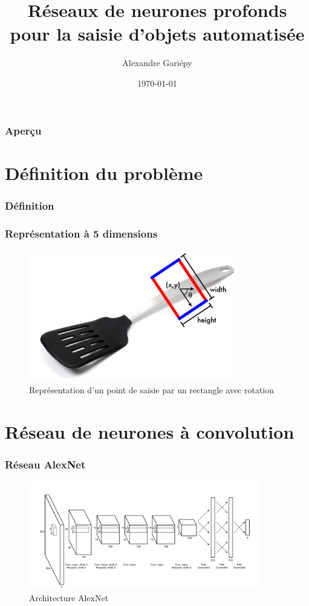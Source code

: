 \documentclass{beamer}
\title[Réseaux de neurones pour saisie automatique]{Réseaux de neurones profonds pour la saisie d'objets automatisée}
\author{Alexandre Gariépy}
\institute[ulaval] 
{
Université Laval \\
\medskip
\textit{alexandre.gariepy.2@ulaval.ca}
}
\date{\today}
\begin{document}
\begin{frame}
\titlepage
\end{frame}

\begin{frame}
\frametitle{Aperçu}
\tableofcontents 
\end{frame}

\section{Définition du problème}
\begin{frame}
  \frametitle{Définition}
  
\end{frame}

\begin{frame}
  \frametitle{Représentation à 5 dimensions}
  \begin{figure}
    \centering
    \includegraphics[width=0.8\textwidth]{img/grasp_rectangle.png}
    \caption{Représentation d'un point de saisie par un rectangle avec rotation}
    \label{fig:grasp_rect}
  \end{figure}
\end{frame}

\section{Réseau de neurones à convolution}
\begin{frame}
  \frametitle{Réseau AlexNet}
  \begin{figure}
    \centering
    \includegraphics[width=0.9\textwidth]{img/alexnet.png}
    \caption{Architecture AlexNet}
    \label{fig:alexnet}
  \end{figure}
\end{frame}
\end{document}
